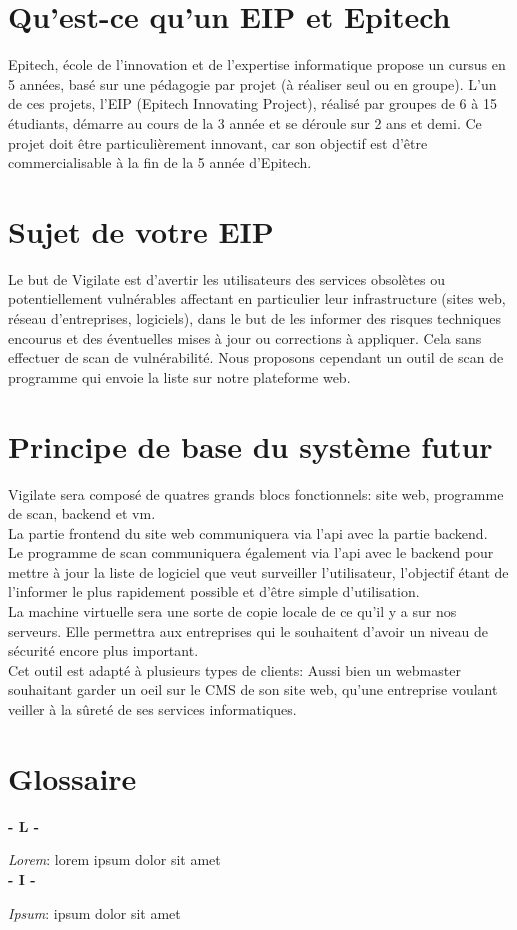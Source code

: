\section{Qu'est-ce qu’un EIP et Epitech}
Epitech, école de l'innovation et de l'expertise informatique propose un cursus en 5 années, basé sur une pédagogie par projet (à réaliser seul ou en groupe). L'un de ces projets, l’EIP (Epitech Innovating Project), réalisé par groupes de 6 à 15 étudiants, démarre au cours de la 3\ieme{} année et se déroule sur 2 ans et demi. Ce projet doit être particulièrement innovant, car son objectif est d’être commercialisable à la fin de la 5\ieme{} année d’Epitech.

\section{Sujet de votre EIP}
Le but de Vigilate est d’avertir les utilisateurs des services obsolètes ou potentiellement vulnérables affectant en particulier leur infrastructure (sites web, réseau d'entreprises, logiciels), dans le but de les informer des risques techniques encourus et des éventuelles mises à jour ou corrections à appliquer.
Cela sans effectuer de scan de vulnérabilité.
Nous proposons cependant un outil de scan de programme qui envoie la liste sur notre plateforme web.

\section{Principe de base du système futur}
Vigilate sera composé de quatres grands blocs fonctionnels: site web, programme de scan, backend et vm.\\
La partie frontend du site web communiquera via l’api avec la partie backend.\\
Le programme de scan communiquera également via l’api avec le backend pour mettre à jour la liste de logiciel que veut surveiller l’utilisateur, l'objectif étant de l’informer le plus rapidement possible et d’être simple d’utilisation.\\
La machine virtuelle sera une sorte de copie locale de ce qu’il y a sur nos serveurs. Elle permettra aux entreprises qui le souhaitent d’avoir un niveau de sécurité encore plus important.\\
Cet outil est adapté à plusieurs types de clients: Aussi bien un webmaster souhaitant garder un oeil sur le CMS de son site web, qu’une entreprise voulant veiller à la sûreté de ses services informatiques.\\

\section{Glossaire}
\noindent

\vskip 0.1cm
\textbf{- L -}\\
\vskip 0.1cm

\textit{Lorem}: lorem ipsum dolor sit amet\\

\vskip 0.1cm
\textbf{- I -}\\
\vskip 0.1cm

\textit{Ipsum}: ipsum dolor sit amet\\


